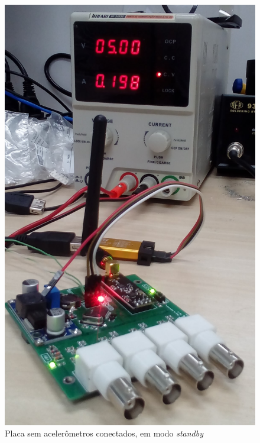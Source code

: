 \documentclass[
	12pt,				%
	openright,			%
	twoside,			%
	a4paper,			%
	english,			%
	french,				%
	spanish,			%
	brazil,				%
	]{abntex2}
\begin{document}
		\begin{figure}[H]
			\centering
			\begin{minipage}{0.4\linewidth}
				\centering
				\includegraphics[width = \linewidth]{../Fotos/consumo0.jpg}
				\caption[Placa sem acelerômetros]{Placa sem acelerômetros conectados, em modo \textit{standby}}
			\end{minipage}
			\hfill\vline\hfill
			\begin{minipage}{0.4\linewidth}
				\centering

\end{minipage}
\end{figure}
\end{document}
